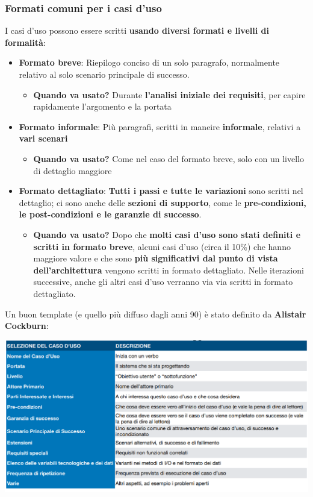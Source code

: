 \documentclass[12pt]{article}
\begin{document}
\subsubsection{Formati comuni per i casi d'uso}
I casi d'uso possono essere scritti \textbf{usando diversi formati e livelli di formalità}:
\begin{itemize}
    \item \textbf{Formato breve}: Riepilogo conciso di un solo paragrafo, normalmente relativo al solo scenario principale di successo.
    \begin{itemize}
        \item \textbf{Quando va usato?} Durante \textbf{l'analisi iniziale dei requisiti}, per capire rapidamente l'argomento e la portata
    \end{itemize}
    \item \textbf{Formato informale}: Più paragrafi, scritti in maneire \textbf{informale}, relativi a \textbf{vari scenari}
    \begin{itemize}
        \item \textbf{Quando va usato?} Come nel caso del formato breve, solo con un livello di dettaglio maggiore
    \end{itemize}
    \item \textbf{Formato dettagliato}: \textbf{Tutti i passi e tutte le variazioni} sono scritti nel dettaglio; ci sono anche delle \textbf{sezioni di supporto}, come le \textbf{pre-condizioni, le post-condizioni e le garanzie di successo}.
    \begin{itemize}
        \item \textbf{Quando va usato?} Dopo che \textbf{molti casi d'uso sono stati definiti e scritti in formato breve}, alcuni casi d'uso (circa il 10\%) che hanno maggiore valore e che sono \textbf{più significativi dal punto di vista dell'architettura} vengono scritti in formato dettagliato. Nelle iterazioni successive, anche gli altri casi d'uso verranno via via scritti in formato dettagliato.
    \end{itemize}
\end{itemize}
Un buon template (e quello più diffuso dagli anni 90) è stato definito da \textbf{Alistair Cockburn}:
\begin{center}
    \includegraphics[width = 1.05\textwidth]{Images/32.png}
\end{center}
\end{document}

